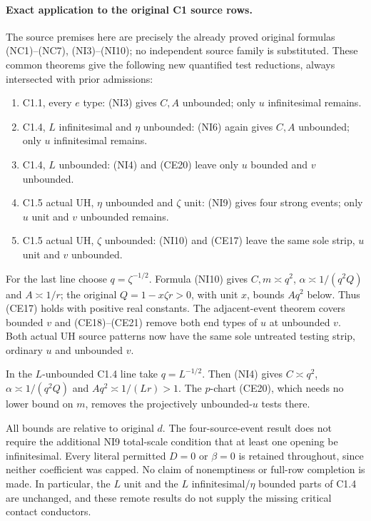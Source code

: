\paragraph{Exact application to the original C1 source rows.}
The source premises here are precisely the already proved original
formulas (NC1)--(NC7), (NI3)--(NI10); no independent source family is
substituted. These common theorems give the following new quantified
test reductions, always intersected with prior admissions:
\begin{enumerate}
\item C1.1, every $e$ type: (NI3) gives $C,A$ unbounded;
only $u$ infinitesimal remains.
\item C1.4, $L$ infinitesimal and $\eta$ unbounded: (NI6)
again gives $C,A$ unbounded; only $u$ infinitesimal remains.
\item C1.4, $L$ unbounded: (NI4) and (CE20) leave only
$u$ bounded and $v$ unbounded.
\item C1.5 actual UH, $\eta$ unbounded and $\zeta$ unit:
(NI9) gives four strong events; only $u$ unit and $v$ unbounded remains.
\item C1.5 actual UH, $\zeta$ unbounded: (NI10) and (CE17)
leave the same sole strip, $u$ unit and $v$ unbounded.
\end{enumerate}
For the last line choose $q=\zeta^{-1/2}$. Formula (NI10) gives
$C,m\asymp q^2$, $\alpha\asymp1/(q^2Q)$ and $A\asymp1/r$;
the original $Q=1-x\zeta r>0$, with unit $x$, bounds $Aq^2$ below.
Thus (CE17) holds with positive real constants. The adjacent-event
theorem covers bounded $v$ and (CE18)--(CE21) remove both end types of
$u$ at unbounded $v$. Both actual UH source patterns now have the same
sole untreated testing strip, ordinary $u$ and unbounded $v$.

In the $L$-unbounded C1.4 line take $q=L^{-1/2}$.
Then (NI4) gives $C\asymp q^2$, $\alpha\asymp1/(q^2Q)$ and
$Aq^2\asymp1/(Lr)>1$. The $p$-chart (CE20), which needs no lower
bound on $m$, removes the projectively unbounded-$u$ tests there.

All bounds are relative to original $d$. The four-source-event result
does not require the additional NI9 total-scale condition that at least
one opening be infinitesimal. Every literal permitted $D=0$ or
$\beta=0$ is retained throughout, since neither coefficient was capped.
No claim of nonemptiness or full-row completion is made. In particular,
the $L$ unit and the $L$ infinitesimal/$\eta$ bounded parts of C1.4 are
unchanged, and these remote results do not supply the missing critical
contact conductors.




